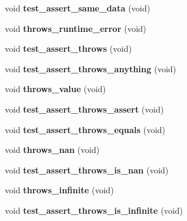 \begin{DoxyCompactItemize}
\item 
\hypertarget{classTest_ae55327b4d33f61c32266d6a63a4611a8}{void {\bfseries test\-\_\-assert\-\_\-same\-\_\-data} (void)}\label{classTest_ae55327b4d33f61c32266d6a63a4611a8}

\item 
\hypertarget{classTest_a60aa77579ca3ca4a84a42bb03ad29e93}{void {\bfseries throws\-\_\-runtime\-\_\-error} (void)}\label{classTest_a60aa77579ca3ca4a84a42bb03ad29e93}

\item 
\hypertarget{classTest_ad67b2cccdbb9d2c6543654a71a241bb5}{void {\bfseries test\-\_\-assert\-\_\-throws} (void)}\label{classTest_ad67b2cccdbb9d2c6543654a71a241bb5}

\item 
\hypertarget{classTest_ab9b9dc78fce3d87dac6bbd3d283e3114}{void {\bfseries test\-\_\-assert\-\_\-throws\-\_\-anything} (void)}\label{classTest_ab9b9dc78fce3d87dac6bbd3d283e3114}

\item 
\hypertarget{classTest_a1c854357364742f107c4230de5c9a0bc}{void {\bfseries throws\-\_\-value} (void)}\label{classTest_a1c854357364742f107c4230de5c9a0bc}

\item 
\hypertarget{classTest_a79bb5846b82f7db9ecda620c2426e281}{void {\bfseries test\-\_\-assert\-\_\-throws\-\_\-assert} (void)}\label{classTest_a79bb5846b82f7db9ecda620c2426e281}

\item 
\hypertarget{classTest_aef4a03e2c8de8af2445cd388af178461}{void {\bfseries test\-\_\-assert\-\_\-throws\-\_\-equals} (void)}\label{classTest_aef4a03e2c8de8af2445cd388af178461}

\item 
\hypertarget{classTest_a84aedfc4d8a565953e891b731456db7a}{void {\bfseries throws\-\_\-nan} (void)}\label{classTest_a84aedfc4d8a565953e891b731456db7a}

\item 
\hypertarget{classTest_acc284bc12bb0c78c942da0f37991cab6}{void {\bfseries test\-\_\-assert\-\_\-throws\-\_\-is\-\_\-nan} (void)}\label{classTest_acc284bc12bb0c78c942da0f37991cab6}

\item 
\hypertarget{classTest_a04f8b13802f012ec9a0e8c9756e02bf6}{void {\bfseries throws\-\_\-infinite} (void)}\label{classTest_a04f8b13802f012ec9a0e8c9756e02bf6}

\item 
\hypertarget{classTest_ad241c62068a3c70975bab496ea04cf50}{void {\bfseries test\-\_\-assert\-\_\-throws\-\_\-is\-\_\-infinite} (void)}\label{classTest_ad241c62068a3c70975bab496ea04cf50}


\end{DoxyCompactItemize}
